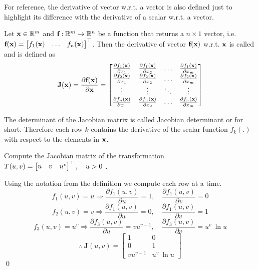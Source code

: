 \documentclass[a4paper]{article}
\begin{document}
For reference, the derivative of vector w.r.t. a vector is also defined just to highlight its difference with the derivative of a scalar w.r.t. a vector.
\begin{definition}[Jacobian matrix]
Let $\textbf{x} \in \mathbb{R}^m$ and $\textbf{f}: \mathbb{R}^m \rightarrow \mathbb{R}^n$ be a function that returns a $n \times 1$ vector, i.e. $\textbf{f}(\textbf{x}) = \begin{bmatrix}f_1(\textbf{x}) & \ldots & f_n(\textbf{x})\end{bmatrix}^{\top}$. Then the derivative of vector $\textbf{f}(\textbf{x})$ w.r.t. $\textbf{x}$ is called  and is defined as \cite{nielsen}
\begin{equation}
    \textbf{J}(\textbf{x}) = \frac{\partial \textbf{f}(\textbf{x})}{\partial \textbf{x}} = 
    \begin{bmatrix}
        \frac{\partial f_1(\textbf{x})}{\partial x_1} & \frac{\partial f_1(\textbf{x})}{\partial x_2} & \ldots & \frac{\partial f_1(\textbf{x})}{\partial x_m} \\   
        \frac{\partial f_2(\textbf{x})}{\partial x_1} & \frac{\partial f_2(\textbf{x})}{\partial x_2} & \ldots & \frac{\partial f_2(\textbf{x})}{\partial x_m} \\
        \vdots & \vdots & \ddots & \vdots \\
        \frac{\partial f_n(\textbf{x})}{\partial x_1} & \frac{\partial f_n(\textbf{x})}{\partial x_2} & \ldots & \frac{\partial f_n(\textbf{x})}{\partial x_m} \\   
    \end{bmatrix}
    \label{eq:def_jac_matrix}
\end{equation}
\end{definition}
The determinant of the Jacobian matrix is called Jacobian determinant or  for short. Therefore each row $k$ contains the derivative of the scalar function $f_k(.)$ with respect to the elements in $\textbf{x}$.
\begin{exmp}
Compute the Jacobian matrix of the transformation $T(u, v) = \begin{bmatrix} u & v & u^v \end{bmatrix}^{\top}, \quad u > 0$ \cite{projectrhea}. 
\end{exmp}
\begin{soln}
Using the notation from the definition we compute each row at a time.
\[
f_1(u, v) = u \Rightarrow \frac{\partial f_1(u,v)}{\partial u} = 1, \quad \frac{\partial f_1(u, v)}{\partial v} = 0 
\]
\[
f_2(u,v) = v \Rightarrow \frac{\partial f_1(u,v)}{\partial u} = 0, \quad \frac{\partial f_1(u, v)}{\partial v} = 1
\]
\[
f_3(u,v) = u^v \Rightarrow \frac{\partial f_3(u,v)}{\partial u} = vu^{v-1}, \quad \frac{\partial f_3(u, v)}{\partial v} = u^v \ \ln u
\]
\[
\therefore \ \textbf{J}(u, v) = 
\begin{bmatrix}
1 & 0 \\
0 & 1 \\
vu^{v-1} & u^v \ \ln u
\end{bmatrix}
\]
\qed
\end{soln}
\end{document}
